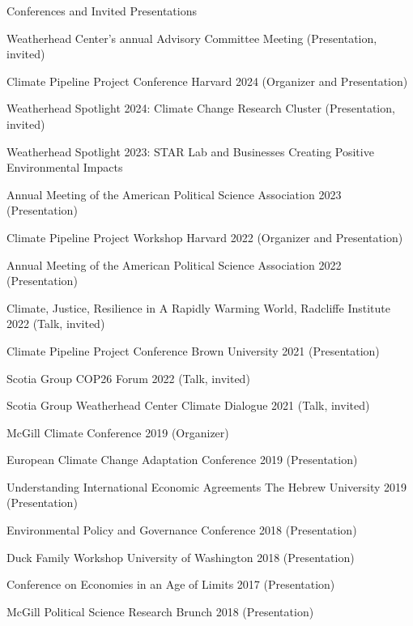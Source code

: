 \documentclass{resume}
\begin{document}
\bigskip

\begin{rSection}{\Large C\MakeLowercase{onferences and} I\MakeLowercase{nvited} P\MakeLowercase{resentations}} \itemsep -2pt
\vspace{-0.7cm}
\item Weatherhead Center’s annual Advisory Committee Meeting (Presentation, invited)
\item Climate Pipeline Project Conference Harvard 2024 (Organizer and Presentation)
\item Weatherhead Spotlight 2024: Climate Change Research Cluster (Presentation, invited)
\item Weatherhead Spotlight 2023: STAR Lab and Businesses Creating Positive Environmental Impacts
\item Annual Meeting of the American Political Science Association 2023 (Presentation)
\item Climate Pipeline Project Workshop Harvard 2022 (Organizer and Presentation)
\item Annual Meeting of the American Political Science Association 2022 (Presentation)
\item  Climate, Justice, Resilience in A Rapidly Warming World, Radcliffe Institute 2022 (Talk, invited) 
\item Climate Pipeline Project Conference Brown University 2021 (Presentation)
\item Scotia Group COP26 Forum 2022 (Talk, invited)
\item Scotia Group Weatherhead Center Climate Dialogue 2021 (Talk, invited)
\item McGill Climate Conference 2019 (Organizer) 
\item European Climate Change Adaptation Conference 2019 (Presentation)
\item Understanding International Economic Agreements The Hebrew University 2019 (Presentation)
\item Environmental Policy and Governance Conference 2018 (Presentation)
\item Duck Family Workshop University of Washington 2018 (Presentation)
\item Conference on Economies in an Age of Limits 2017 (Presentation) 
\item McGill Political Science Research Brunch 2018 (Presentation)
\end{rSection}


\bigskip
\end{document}
